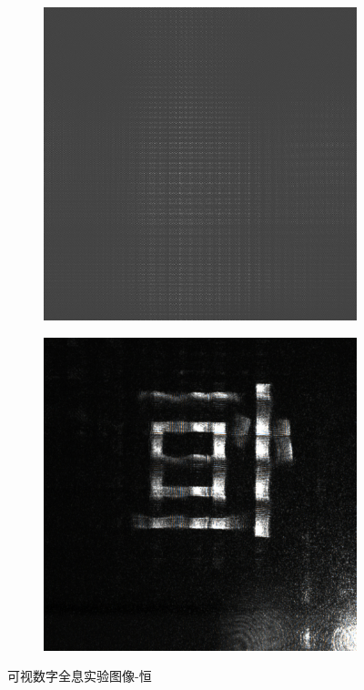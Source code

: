 \documentclass{ctexart}
\begin{document}
\begin{figure}[H]
  \centering
  \begin{subfigure}{.48\textwidth}
    \includegraphics[width=\linewidth]{数字全息实验数据/可视数字全息/实验中使用的全息图-恒.jpg}
  \end{subfigure}
  \begin{subfigure}{.48\textwidth}
    \includegraphics[width=\linewidth]{数字全息实验数据/可视数字全息/原图-恒.jpg}
  \end{subfigure}
  \caption{可视数字全息实验图像-恒}
\end{figure}
\end{document}
